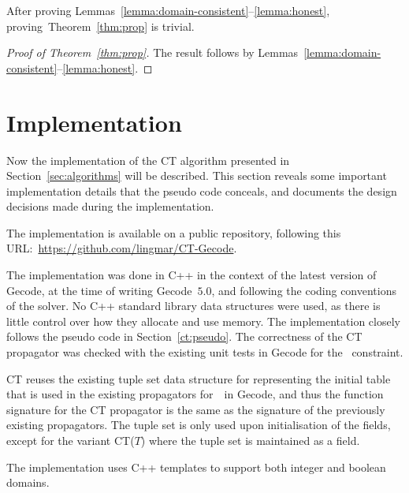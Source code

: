 \documentclass[a4paper,11pt]{article}
\theoremstyle{definition}
\newcommand{\Secref}[1]{Section~\ref{#1}}
\newcommand{\Table}{\Constraint{Table}}
\newcommand{\Thmref}[1]{Theorem~\ref{#1}}
\numberwithin{equation}{section}
\begin{document}
After proving Lemmas~\ref{lemma:domain-consistent}--\ref{lemma:honest},
proving~\Thmref{thm:prop} is trivial.

\begin{proof}[Proof of \Thmref{thm:prop}]
  The result follows by Lemmas~\ref{lemma:domain-consistent}--\ref{lemma:honest}.
\end{proof}

\section{Implementation}
\label{sec:implementation}

Now the implementation of the CT algorithm presented in
\Secref{sec:algorithms} will be described.
This section reveals some important implementation details
that the pseudo code conceals, and documents the design decisions made during
the implementation.

The implementation is available on a public repository,
following this URL:~\url{https://github.com/lingmar/CT-Gecode}.

The implementation was done in C++ in the context of the latest version of Gecode,
at the time of writing Gecode~$5.0$, and following the coding conventions of
the solver.
No C++ standard library data structures
were used, as there is little control over how they allocate and use memory.
The implementation closely follows the pseudo code in \Secref{ct:pseudo}.
The correctness of the CT propagator was checked with the existing unit tests
in Gecode for the \Table~constraint.

CT reuses the existing tuple set data structure for representing the initial table
that is used in the existing propagators for~\Table~in Gecode, and thus the function
signature for the CT propagator is the same as the signature of the previously
existing propagators. The tuple set
is only used upon initialisation of the fields, except for the variant CT($T$) where
the tuple set is maintained as a field.

The implementation uses C++ templates to support both integer and boolean domains.
\end{document}
